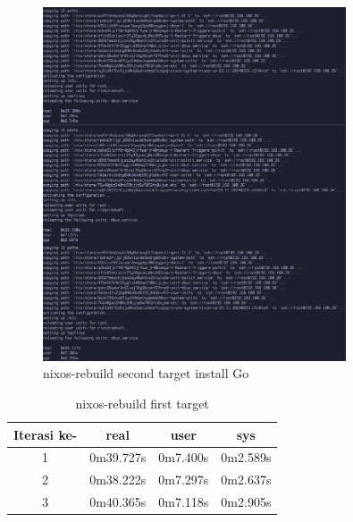 \documentclass[10pt,twoside]{report}
\begin{document}
\begin{adjustwidth}{20pt}{}
	\begin{figure}[H]
		\begin{center}
			\includegraphics[width=0.8\textwidth]{images/nix-target/nix-go-26-com.png}
		\end{center}
		\caption{nixos-rebuild second target install Go}
	\end{figure}
	\begin{table}[H]
		\caption{nixos-rebuild first target}
		\begin{center}
			\begin{tabular}[c]{|c|c|c|c|}
				\hline
				\multicolumn{1}{|c|}{\textbf{Iterasi ke-}} &
				\multicolumn{1}{c|}{\textbf{real}}         &
				\multicolumn{1}{c|}{\textbf{user}}         &
				\multicolumn{1}{c|}{\textbf{sys}}                                            \\
				\hline
				1                                          & 0m39.727s & 0m7.400s & 0m2.589s \\
				\hline
				2                                          & 0m38.222s & 0m7.297s & 0m2.637s \\
				\hline
				3                                          & 0m40.365s & 0m7.118s & 0m2.905s \\
				\hline
			\end{tabular}
		\end{center}
	\end{table}
	\vspace{-5mm}

\end{adjustwidth}
\end{document}
